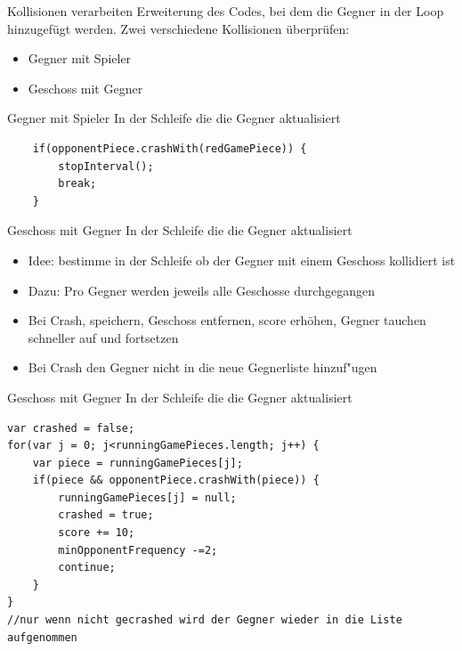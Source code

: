 \documentclass[18pt]{beamer}
\begin{document}
\begin{frame}{Kollisionen verarbeiten}
Erweiterung des Codes, bei dem die Gegner in der Loop hinzugefügt werden.
Zwei verschiedene Kollisionen überprüfen:
\begin{itemize}
	\item Gegner mit Spieler
	\item Geschoss mit Gegner
\end{itemize}
\end{frame}

\begin{frame}[fragile]{Gegner mit Spieler}
In der Schleife die die Gegner aktualisiert
\begin{lstlisting}
	if(opponentPiece.crashWith(redGamePiece)) {
		stopInterval();
		break;
	}
\end{lstlisting}
\end{frame}

\begin{frame}{Geschoss mit Gegner}
In der Schleife die die Gegner aktualisiert
\begin{itemize}
	\item Idee: bestimme in der Schleife ob der Gegner mit einem Geschoss kollidiert ist
	\item Dazu: Pro Gegner werden jeweils alle Geschosse durchgegangen
	\item Bei Crash, speichern, Geschoss entfernen, score erhöhen, Gegner tauchen schneller auf und fortsetzen
	\item Bei Crash den Gegner nicht in die neue Gegnerliste hinzuf"ugen
\end{itemize}
\end{frame}

\begin{frame}[fragile]{Geschoss mit Gegner}
In der Schleife die die Gegner aktualisiert
\begin{lstlisting}
var crashed = false;
for(var j = 0; j<runningGamePieces.length; j++) {
	var piece = runningGamePieces[j];
	if(piece && opponentPiece.crashWith(piece)) {
		runningGamePieces[j] = null;
		crashed = true;
		score += 10;
		minOpponentFrequency -=2;
		continue;
	}
}
//nur wenn nicht gecrashed wird der Gegner wieder in die Liste aufgenommen
\end{lstlisting}
\end{frame}
\end{document}
